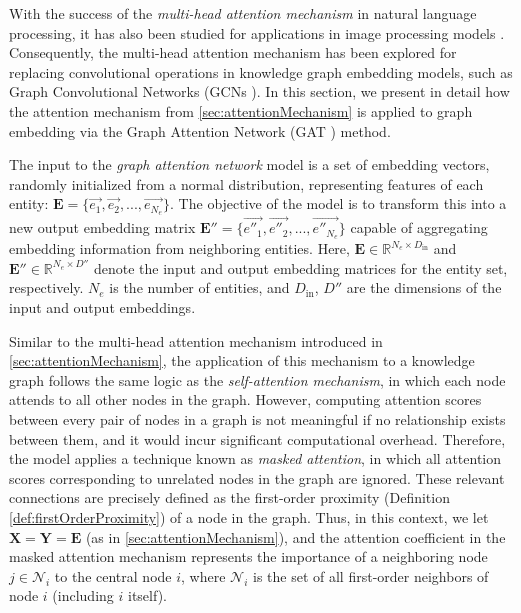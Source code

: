 With the success of the \textit{multi-head attention mechanism} in natural language processing, it has also been studied for applications in image processing models \cite{ramachandran2019stand}. Consequently, the multi-head attention mechanism has been explored for replacing convolutional operations in knowledge graph embedding models, such as Graph Convolutional Networks (GCNs \cite{kipf2016semi}). In this section, we present in detail how the attention mechanism from \ref{sec:attentionMechanism} is applied to graph embedding via the Graph Attention Network (GAT \cite{velivckovic2017graph}) method.

The input to the \textit{graph attention network} model is a set of embedding vectors, randomly initialized from a normal distribution, representing features of each entity: $\mathbf{E} = \Big\{\overrightarrow{e_1}, \overrightarrow{e_2}, ...,  \overrightarrow{e_{N_e}}\Big\}$. The objective of the model is to transform this into a new output embedding matrix $\mathbf{E}'' = \Big\{\overrightarrow{e''_1}, \overrightarrow{e''_2}, ...,  \overrightarrow{e''_{N_e}}\Big\}$ capable of aggregating embedding information from neighboring entities. Here, $\mathbf{E} \in \mathbb{R}^{N_e \times D_{\text{in}}}$ and $\mathbf{E}'' \in \mathbb{R}^{N_e \times D''}$ denote the input and output embedding matrices for the entity set, respectively. $N_e$ is the number of entities, and $D_{\text{in}}$, $D''$ are the dimensions of the input and output embeddings.

Similar to the multi-head attention mechanism introduced in \ref{sec:attentionMechanism}, the application of this mechanism to a knowledge graph follows the same logic as the \textit{self-attention mechanism}, in which each node attends to all other nodes in the graph. However, computing attention scores between every pair of nodes in a graph is not meaningful if no relationship exists between them, and it would incur significant computational overhead. Therefore, the model applies a technique known as \textit{masked attention}, in which all attention scores corresponding to unrelated nodes in the graph are ignored. These relevant connections are precisely defined as the first-order proximity (Definition \ref{def:firstOrderProximity}) of a node in the graph. Thus, in this context, we let $\mathbf{X} = \mathbf{Y} = \mathbf{E}$ (as in \ref{sec:attentionMechanism}), and the attention coefficient in the masked attention mechanism represents the importance of a neighboring node $j \in \mathcal{N}_{i}$ to the central node $i$, where $\mathcal{N}_{i}$ is the set of all first-order neighbors of node $i$ (including $i$ itself).




